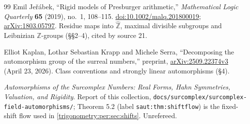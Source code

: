 \documentclass[11pt,letterpaper]{article}
\numberwithin{equation}{section}
\theoremstyle{definition}
\theoremstyle{remark}
\newcommand{\Z}{\mathbb Z}
\newcommand{\Zhat}{\widehat{\Z}}
\begin{document}
\begin{thebibliography}{99}
Emil Je\v{r}\'abek, ``Rigid models of Presburger arithmetic,''
\emph{Mathematical Logic Quarterly} \textbf{65} (2019), no.~1, 108--115.
\href{https://doi.org/10.1002/malq.201800019}{doi:10.1002/malq.201800019};
\href{https://arxiv.org/abs/1803.05797}{arXiv:1803.05797}. Residue maps into $\Zhat$, maximal divisible
subgroups and Leibnizian $\Z$-groups (\S\S2--4), cited by source 21.

Elliot Kaplan, Lothar Sebastian Krapp and Michele Serra, ``Decomposing the automorphism group of the
surreal numbers,'' preprint, \href{https://arxiv.org/abs/2509.22374v3}{arXiv:2509.22374v3}
(April 23, 2026). Class conventions and strongly linear automorphisms (\S4).

\emph{Automorphisms of the Surcomplex Numbers: Real Forms, Hahn Symmetries, Valuation, and Rigidity}.
Report of this collection, \texttt{docs/surcomplex/surcomplex-field-automorphisms/}; Theorem 5.2
(label \texttt{saut:thm:shiftflow}) is the fixed-shift flow used in \cref{trigonometry:per:sec:shifts}.
Unrefereed.

\end{thebibliography}\endgroup
\end{document}
